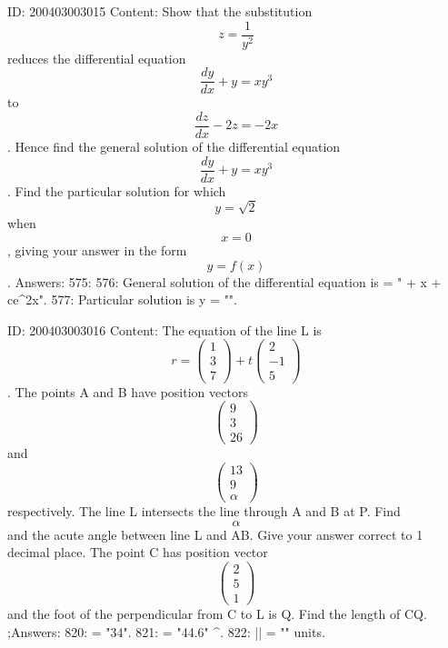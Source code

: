 \documentclass{article}
\begin{document}
ID: 200403003015
Content:
Show that the substitution  $$z = \frac{1}{y^2}$$ reduces the differential equation  $$\frac{dy}{dx}+y = xy^3 $$ to  $$\frac{dz}{dx}-2z = -2x$$. Hence find the general solution of the differential equation  $$\frac{dy}{dx} + y = xy^3 $$. Find the particular solution for which  $$y = \sqrt 2 $$ when $$x = 0$$, giving your answer in the form $$y = f(x)$$.  Answers:
575: 
576: General solution of the differential equation is  = " + x + ce^{2x}".
577: Particular solution is y = "".

ID: 200403003016
Content:
The equation of the line L is  $$r =  \begin{pmatrix} 1\\ 3\\ 7 \end{pmatrix} + t \begin{pmatrix} 2\\ -1\\ 5 \end{pmatrix}$$. The points A and B have position vectors  $$ \begin{pmatrix} 9\\ 3\\ 26 \end{pmatrix}$$ and  $$ \begin{pmatrix} 13\\ 9\\ \alpha \end{pmatrix}$$ respectively. The line L intersects the line through A and B at P. Find  $$\alpha $$ and the acute angle between line L and AB. Give your answer correct to 1 decimal place. The point C has position vector  $$ \begin{pmatrix} 2\\ 5\\ 1 \end{pmatrix}$$ and the foot of the perpendicular from C to L is Q. Find the length of CQ. ;Answers:
820: \alpha = "34".
821: \theta = "44.6" ^{\circ}.
822: || = "" units.
\end{document}
